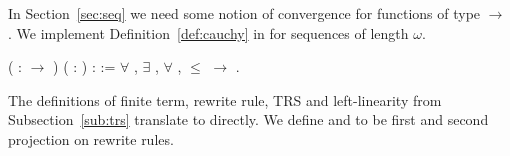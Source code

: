 In Section~\ref{sec:seq} we need some notion of convergence for functions of
type
$\rightarrow$
. We implement
Definition~\ref{def:cauchy} in \Coq for sequences of length $\omega$.
\begin{singlespace}
\begin{coqdoccode}
\coqdocnoindent
{}
( :
\ensuremath{\rightarrow} )
( : ) :
 :=\coqdoceol
\coqdocindent{1.00em}
\ensuremath{\forall} , \ensuremath{\exists} ,
\ensuremath{\forall} ,
 \ensuremath{\le} 
\ensuremath{\rightarrow}
 
.\coqdoceol
\end{coqdoccode}
\end{singlespace}
The definitions of finite term, rewrite rule, TRS and left-linearity
from Subsection~\ref{sub:trs} translate to \Coq directly. We define
 and
 to be first and
second projection on rewrite rules.

